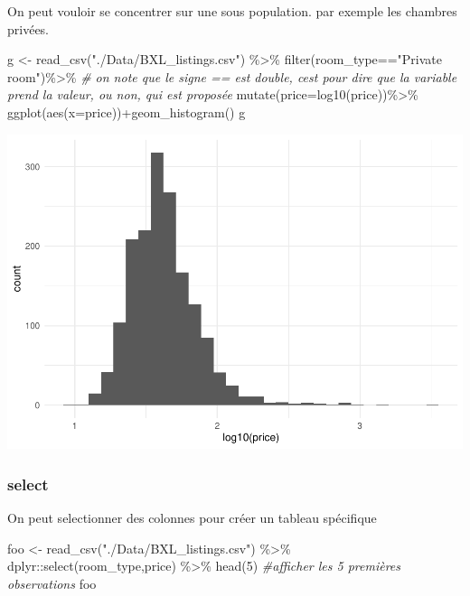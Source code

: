 \documentclass[
]{book}
\newenvironment{Shaded}{\begin{snugshade}}{\end{snugshade}}
\newcommand{\AttributeTok}[1]{\textcolor[rgb]{0.77,0.63,0.00}{#1}}
\newcommand{\CommentTok}[1]{\textcolor[rgb]{0.56,0.35,0.01}{\textit{#1}}}
\newcommand{\DecValTok}[1]{\textcolor[rgb]{0.00,0.00,0.81}{#1}}
\newcommand{\FunctionTok}[1]{\textcolor[rgb]{0.00,0.00,0.00}{#1}}
\newcommand{\NormalTok}[1]{#1}
\newcommand{\OtherTok}[1]{\textcolor[rgb]{0.56,0.35,0.01}{#1}}
\newcommand{\SpecialCharTok}[1]{\textcolor[rgb]{0.00,0.00,0.00}{#1}}
\newcommand{\StringTok}[1]{\textcolor[rgb]{0.31,0.60,0.02}{#1}}
\begin{document}
On peut vouloir se concentrer sur une sous population. par exemple les chambres privées.

\begin{Shaded}
\begin{Highlighting}[]
\NormalTok{g }\OtherTok{\textless{}{-}} \FunctionTok{read\_csv}\NormalTok{(}\StringTok{"./Data/BXL\_listings.csv"}\NormalTok{) }\SpecialCharTok{\%\textgreater{}\%} 
  \FunctionTok{filter}\NormalTok{(room\_type}\SpecialCharTok{==}\StringTok{"Private room"}\NormalTok{)}\SpecialCharTok{\%\textgreater{}\%} 
  \CommentTok{\# on note que le signe == est double, c\textquotesingle{}est pour dire que la variable prend la valeur, ou non, qui est proposée}
  \FunctionTok{mutate}\NormalTok{(}\AttributeTok{price=}\FunctionTok{log10}\NormalTok{(price))}\SpecialCharTok{\%\textgreater{}\%}
  \FunctionTok{ggplot}\NormalTok{(}\FunctionTok{aes}\NormalTok{(}\AttributeTok{x=}\NormalTok{price))}\SpecialCharTok{+}\FunctionTok{geom\_histogram}\NormalTok{()}
\NormalTok{g}
\end{Highlighting}
\end{Shaded}

\includegraphics{bookdown-demo_files/figure-latex/0205-1.pdf}

\hypertarget{select}{%
\subsubsection{select}\label{select}}

On peut selectionner des colonnes pour créer un tableau spécifique

\begin{Shaded}
\begin{Highlighting}[]
\NormalTok{foo }\OtherTok{\textless{}{-}} \FunctionTok{read\_csv}\NormalTok{(}\StringTok{"./Data/BXL\_listings.csv"}\NormalTok{) }\SpecialCharTok{\%\textgreater{}\%}
\NormalTok{  dplyr}\SpecialCharTok{::}\FunctionTok{select}\NormalTok{(room\_type,price) }\SpecialCharTok{\%\textgreater{}\%} 
  \FunctionTok{head}\NormalTok{(}\DecValTok{5}\NormalTok{) }\CommentTok{\#afficher les 5 premières observations}
\NormalTok{foo}
\end{Highlighting}
\end{Shaded}
\end{document}
